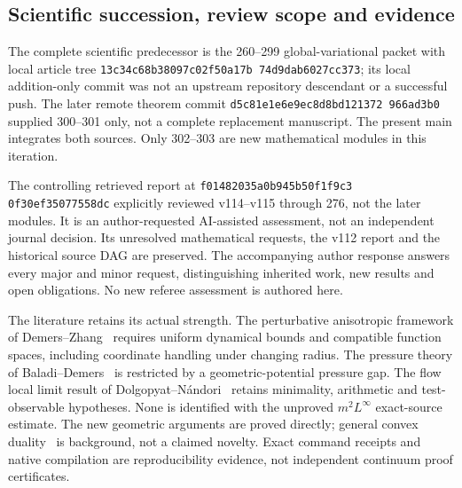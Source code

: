 \documentclass[11pt,reqno]{amsart}
\numberwithin{equation}{section}
\theoremstyle{definition}\newtheorem{definition}[theorem]{Definition}
\theoremstyle{remark}\newtheorem{remark}[theorem]{Remark}
\begin{document}
\subsection*{Scientific succession, review scope and evidence}
The complete scientific predecessor is the 260--299 global-variational
packet with local article tree
\texttt{13c34c68\allowbreak b38097c0\allowbreak 2f50a17b\allowbreak
74d9dab6\allowbreak 027cc373}; its local addition-only commit was
not an upstream repository descendant or a successful push.
The later remote theorem commit
\texttt{d5c81e1e\allowbreak 6e9ec8d8\allowbreak bd121372\allowbreak
966ad3b0} supplied 300--301 only, not a complete
replacement manuscript. The present main integrates both sources.
Only 302--303 are new mathematical modules in this iteration.

The controlling retrieved report at
\texttt{f0148203\allowbreak 5a0b945b\allowbreak 50f1f9c3\allowbreak
0f30ef35\allowbreak 077558dc} explicitly reviewed v114--v115 through
276, not the later modules. It is an author-requested AI-assisted
assessment, not an independent journal decision. Its unresolved
mathematical requests, the v112 report and the historical source DAG
are preserved. The accompanying author response answers every major
and minor request, distinguishing inherited work, new results and
open obligations. No new referee assessment is authored here.

The literature retains its actual strength. The perturbative
anisotropic framework of Demers--Zhang~\cite{DZUniform} requires
uniform dynamical bounds and compatible function spaces, including
coordinate handling under changing radius. The pressure theory of
Baladi--Demers~\cite{BDPressure} is restricted by a geometric-potential
pressure gap. The flow local limit result of
Dolgopyat--N\'andori~\cite{DNFlow} retains minimality, arithmetic and
test-observable hypotheses. None is identified with the unproved
$m^2L^\infty$ exact-source estimate. The new geometric arguments are
proved directly; general convex duality~\cite{BVNotes} is background,
not a claimed novelty. Exact command receipts and native compilation
are reproducibility evidence, not independent continuum proof
certificates.
\end{document}
